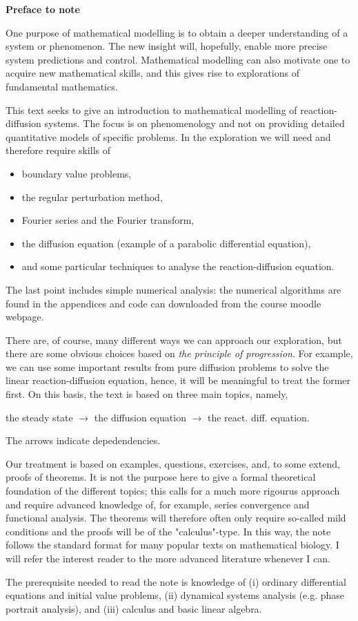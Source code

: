 
\begin{center}{\Large{\textbf{Preface to note}}}\end{center}

\bigskip 

\noindent One purpose of mathematical modelling is to obtain a deeper understanding of 
a system or phenomenon. 
The new insight will, hopefully, enable more precise system predictions and control. 
Mathematical modelling can also motivate one to acquire new mathematical skills, and this gives rise 
to explorations of fundamental mathematics. 

This text seeks to give an introduction to mathematical modelling of reaction-diffusion systems. The focus is on 
phenomenology and not on providing detailed quantitative models of specific problems. In the exploration we will 
need and therefore require skills of 
\begin{itemize}
	\item boundary value problems,
	\item the regular perturbation method,
	\item Fourier series and the Fourier transform,
	\item the diffusion equation (example of a parabolic differential equation),
	\item and some particular techniques to analyse the reaction-diffusion equation.
\end{itemize}
The last point includes simple numerical analysis: the numerical algorithms are 
found in the appendices and code can downloaded from the course moodle webpage.  

There are, of course, many different ways we can approach our exploration, but 
there are some obvious choices based on \emph{the principle of progression}. For example, we can 
use some important results from pure diffusion problems to solve the linear reaction-diffusion equation, hence, it 
will be meaningful to treat the former first. On this basis, the text is based on three 
main topics, namely,  
\begin{center}
	the steady state $\rightarrow$ the diffusion equation $\rightarrow$ the
	react. diff. equation.	
\end{center}
The arrows indicate depedendencies. 

Our treatment is based on examples, questions, exercises, and, to some extend, proofs of theorems. It is not 
the purpose here to give a formal theoretical foundation of the different topics; this calls for a much more 
rigourus approach and require advanced knowledge of, for example, series convergence and functional analysis.  
The theorems will therefore often only require so-called mild conditions and the proofs will be of the "calculus"-type. 
In this way, the note follows the standard format for many popular texts on mathematical biology.  
I will refer the interest reader to the more advanced literature whenever I can. 

The prerequisite needed to read the note is knowledge of (i) ordinary differential 
equations and initial value problems, (ii) dynamical systems analysis (e.g. phase portrait analysis), 
and (iii) calculus and basic linear algebra. 


